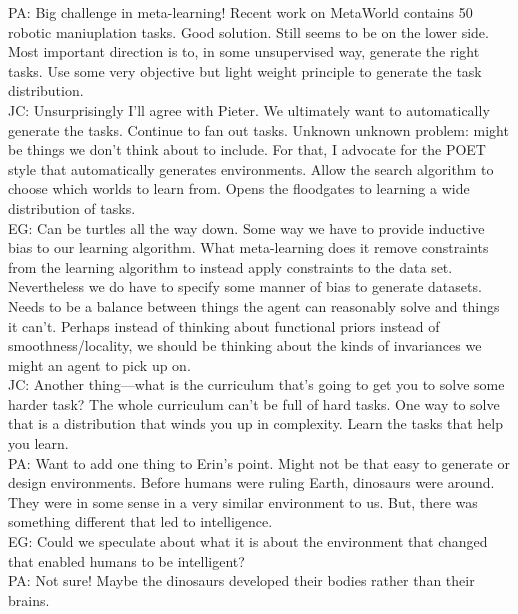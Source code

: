 PA: Big challenge in meta-learning! Recent work on MetaWorld contains 50 robotic maniuplation tasks. Good solution. Still seems to be on the lower side. Most important direction is to, in some unsupervised way, generate the right tasks. Use some very objective but light weight principle to generate the task distribution. \\

JC: Unsurprisingly I'll agree with Pieter. We ultimately want to automatically generate the tasks. Continue to fan out tasks. Unknown unknown problem: might be things we don't think about to include. For that, I advocate for the POET style that automatically generates environments. Allow the search algorithm to choose which worlds to learn from. Opens the floodgates to learning a wide distribution of tasks. \\

EG: Can be turtles all the way down. Some way we have to provide inductive bias to our learning algorithm. What meta-learning does it remove constraints from the learning algorithm to instead apply constraints to the data set. Nevertheless we do have to specify some manner of bias to generate datasets. Needs to be a balance between things the agent can reasonably solve and things it can't. Perhaps instead of thinking about functional priors instead of smoothness/locality, we should be thinking about the kinds of invariances we might an agent to pick up on. \\

JC: Another thing---what is the curriculum that's going to get you to solve some harder task? The whole curriculum can't be full of hard tasks. One way to solve that is a distribution that winds you up in complexity. Learn the tasks that help you learn. \\

PA: Want to add one thing to Erin's point. Might not be that easy to generate or design environments. Before humans were ruling Earth, dinosaurs were around. They were in some sense in a very similar environment to us. But, there was something different that led to intelligence. \\

EG: Could we speculate about what it is about the environment that changed that enabled humans to be intelligent? \\

PA: Not sure! Maybe the dinosaurs developed their bodies rather than their brains. \\


